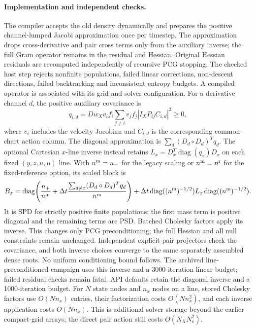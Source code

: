 \documentclass[11pt,letterpaper]{article}
\begin{document}
\paragraph{Implementation and independent checks.}
The compiler accepts the old density dynamically and prepares the positive
channel-lumped Jacobi approximation once per timestep. The approximation drops
cross-derivative and pair cross terms only from the auxiliary inverse; the
full Gram operator remains in the residual and Hessian. Original Hessian
residuals are recomputed independently of recursive PCG stopping. The checked
host step rejects nonfinite populations, failed linear corrections,
non-descent directions, failed backtracking and inconsistent entropy budgets.
A compiled operator is associated with its grid and solver configuration.
For a derivative channel $d$, the positive auxiliary covariance is
\[
 q_{i,d}=D w_X v_i f_i\sum_{j\ne i}v_jf_j
             |I_XP_{ij}C_{i,d}|^2\ge0,
\]
where $v_i$ includes the velocity Jacobian and $C_{i,d}$ is the corresponding
common-chart action column. The diagonal approximation is
$\sum_d(D_d\circ D_d)^Tq_d$. The optional Cartesian $x$-line inverse instead
retains $L_x=D_x^T\operatorname{diag}(q_x)D_x$ on each fixed
$(y,z,u,\mu)$ line. With $n^{\rm m}=n_-$ for the legacy scaling or
$n^{\rm m}=n^{\rm r}$ for the fixed-reference option, its scaled block is
\[
 B_x=\operatorname{diag}\!\left(\frac{n_+}{n^{\rm m}}
       +\Delta t\frac{\sum_{d\ne x}(D_d\circ D_d)^Tq_d}{n^{\rm m}}\right)
       +\Delta t\operatorname{diag}((n^{\rm m})^{-1/2})L_x
                   \operatorname{diag}((n^{\rm m})^{-1/2}).
\]
It is SPD for strictly positive finite populations: the first mass term is
positive diagonal and the remaining terms are PSD. Batched Cholesky factors
apply its inverse. This changes only PCG preconditioning; the full Hessian
and all null constraints remain unchanged. Independent explicit-pair
projectors check the covariance, and both inverse choices converge to the
same separately assembled dense roots. No uniform conditioning bound follows.
The archived line-preconditioned campaign uses this inverse and a
3000-iteration linear budget;
failed residual checks remain fatal. API defaults retain the diagonal inverse
and a 1000-iteration budget.
For $N$ state nodes and $n_x$ nodes on a line, stored Cholesky factors use
$O(Nn_x)$ entries, their factorization costs $O(Nn_x^2)$, and each inverse
application costs $O(Nn_x)$. This is additional solver storage beyond the
earlier compact-grid arrays; the direct pair action still costs $O(N_XN_v^2)$.
\end{document}
